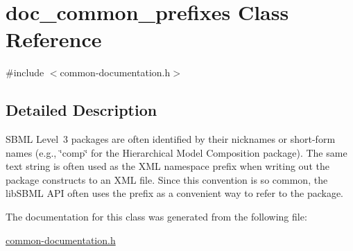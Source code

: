 \hypertarget{classdoc__common__prefixes}{}\section{doc\+\_\+common\+\_\+prefixes Class Reference}
\label{classdoc__common__prefixes}


{\ttfamily \#include $<$common-\/documentation.\+h$>$}



\subsection{Detailed Description}
\begin{DoxyParagraph}{}
S\+B\+ML Level~3 packages are often identified by their nicknames or short-\/form names (e.\+g., \char`\"{}comp\char`\"{} for the Hierarchical Model Composition package). The same text string is often used as the X\+ML namespace prefix when writing out the package constructs to an X\+ML file. Since this convention is so common, the lib\+S\+B\+ML A\+PI often uses the prefix as a convenient way to refer to the package. 
\end{DoxyParagraph}


The documentation for this class was generated from the following file\+:\begin{DoxyCompactItemize}
\item 
\hyperlink{common-documentation_8h}{common-\/documentation.\+h}\end{DoxyCompactItemize}
